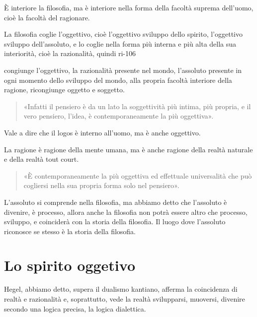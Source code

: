 \documentclass[a4paper,12pt,oneside,openany]{book}%
\begin{document}
È interiore la filosofia, ma è interiore nella forma della facoltà suprema dell’uomo, cioè la facoltà del ragionare.

La filosofia coglie l’oggettivo, cioè l’oggettivo sviluppo dello spirito, l’oggettivo sviluppo dell’assoluto, e lo coglie nella forma più interna e più alta della sua interiorità, cioè la razionalità, quindi ri-106

congiunge l’oggettivo, la razionalità presente nel mondo, l’assoluto presente in ogni momento dello sviluppo del mondo, alla propria facoltà interiore della ragione, ricongiunge oggetto e soggetto.

\begin{quote}
	«Infatti il pensiero è da un lato la soggettività più intima, più propria, e il vero pensiero, l’idea, è contemporaneamente la più oggettiva».
\end{quote}

Vale a dire che il logos è interno all’uomo, ma è anche oggettivo.

La ragione è ragione della mente umana, ma è anche ragione della realtà naturale e della realtà tout court.

\begin{quotation}
	«È contemporaneamente la più oggettiva ed effettuale universalità che può cogliersi nella sua propria forma solo nel pensiero».
\end{quotation}

L’assoluto si comprende nella filosofia, ma abbiamo detto che l’assoluto è divenire, è processo, allora anche la filosofia non potrà essere altro che processo, sviluppo, e coinciderà con la storia della filosofia. Il luogo dove l’assoluto riconosce se stesso è la storia della filosofia.
	
\section*{Lo spirito oggetivo}
	
Hegel, abbiamo detto, supera il dualismo kantiano, afferma la coincidenza di realtà e razionalità e, soprattutto, vede la realtà svilupparsi, muoversi, divenire secondo una logica precisa, la logica dialettica.
\end{document}
